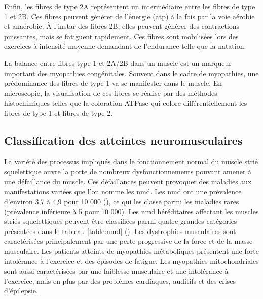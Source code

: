 Enfin, les fibres de type 2A représentent un intermédiaire entre les fibres de type 1 et 2B. Ces fibres peuvent générer de l'énergie (\gls{atp}) à la fois par la voie aérobie et anaérobie. À l'instar des fibres 2B, elles peuvent générer des contractions puissantes, mais se fatiguent rapidement. Ces fibres sont mobilisées lors des exercices à intensité moyenne demandant de l'endurance telle que la natation.


La balance entre fibres type 1 et 2A/2B dans un muscle est un marqueur important des myopathies congénitales. Souvent dans le cadre de myopathies, une prédominance des fibres de type 1 va se manifester dans le muscle. En microscopie, la visualisation de ces fibres se réalise par des méthodes histochimiques telles que la coloration ATPase qui colore différentiellement les fibres de type 1 et fibres de type 2. 

\subsection{Classification des atteintes neuromusculaires}
La variété des processus impliqués dans le fonctionnement normal du muscle strié squelettique ouvre la porte de nombreux dysfonctionnements pouvant amener à une défaillance du muscle. Ces défaillances peuvent provoquer des maladies aux manifestations variées que l'on nomme les \gls{nmd}. Les \gls{nmd} ont une prévalence d'environ 3,7 à 4,9 pour 10 000 (\cite{lace_overview_2022}), ce qui les classe parmi les maladies rares (prévalence inférieure à 5 pour 10 000). Les \gls{nmd} héréditaires affectant les muscles striés squelettiques peuvent être classifiées parmi quatre grandes catégories présentées dans le tableau \ref{table:nmd} (\cite{lornage_identification_2019, benarroch_2023_2023}). Les dystrophies musculaires sont caractérisées principalement par une perte progressive de la force et de la masse musculaire. Les patients atteints de myopathies métaboliques présentent une forte intolérance à l'exercice et des épisodes de fatigue. Les myopathies mitochondriales sont aussi caractérisées par une faiblesse musculaire et une intolérance à l'exercice, mais en plus par des problèmes cardiaques, auditifs et des crises d'épilepsie.

